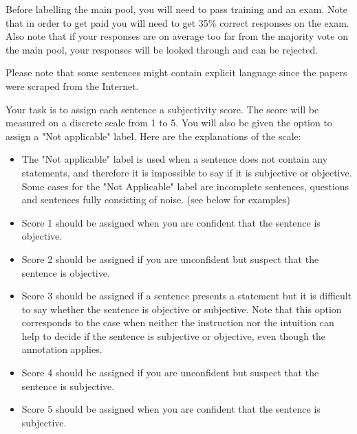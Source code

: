 \documentclass[conference]{IEEEtran}
\begin{document}
Before labelling the main pool, you will need to pass training and an exam. Note that in order to get paid you will need to get 35\% correct responses on the exam. Also note that if your responses are on average too far from the majority vote on the main pool, your responses will be looked through and can be rejected.

Please note that some sentences might contain explicit language since the papers were scraped from the Internet.

Your task is to assign each sentence a subjectivity score. The score will be measured on a discrete scale from 1 to 5. You will also be given the option to assign a "Not applicable" label. Here are the explanations of the scale:

\begin{itemize}
    \item The "Not applicable" label is used when a sentence does not contain any statements, and therefore it is impossible to say if it is subjective or objective. Some cases for the "Not Applicable" label are incomplete sentences, questions and sentences fully consisting of noise. (see below for examples)
    \item Score 1 should be assigned when you are confident that the sentence is objective.
    \item Score 2 should be assigned if you are unconfident but suspect that the sentence is objective.
    \item Score 3 should be assigned if a sentence presents a statement but it is difficult to say whether the sentence is objective or subjective. Note that this option corresponds to the case when neither the instruction nor the intuition can help to decide if the sentence is subjective or objective, even though the annotation applies.
    \item Score 4 should be assigned if you are unconfident but suspect that the sentence is subjective.
    \item Score 5 should be assigned when you are confident that the sentence is subjective.
\end{itemize}
\end{document}
